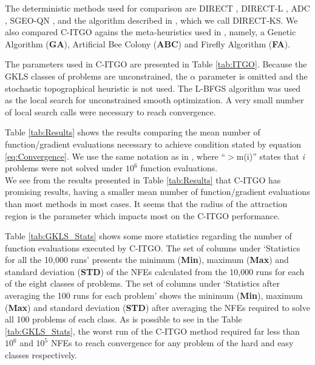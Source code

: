The deterministic methods used for comparison are DIRECT \citep{DIRECT}, DIRECT-L \citep{DIRECTL}, ADC \citep{ADC}, SGEO-QN \citep{SGEO}, and the algorithm described in \cite{ADC2}, which we call DIRECT-KS. We also compared C-ITGO agains the meta-heuristics used in \cite{NAT}, namely, a Genetic Algorithm (\textbf{GA}), Artificial Bee Colony (\textbf{ABC}) and Firefly Algorithm (\textbf{FA}).

The parameters used in C-ITGO are presented in Table \ref{tab:ITGO}. Because the GKLS classes of problems are unconstrained, the $\alpha$ parameter is omitted and the stochastic topographical heuristic is not used. The L-BFGS algorithm was used as the local search for unconstrained smooth optimization. A very small number of local search calls were necessary to reach convergence.



Table \ref{tab:Results} shows the results comparing the mean number of function/gradient evaluations necessary to achieve condition stated by equation \ref{eq:Convergence}. We use the same notation as in \cite{NAT}, where “$>$m(i)” states that \textit{i} problems were not solved under $10^6$ function evaluations.\\




We see from the results presented in Table \ref{tab:Results} that C-ITGO has promising results, having a smaller mean number of function/gradient evaluations than most methods in most cases. It seems that the radius of the attraction region is the parameter which impacts most on the C-ITGO performance. 

Table \ref{tab:GKLS_Stats} shows some more statistics regarding the number of function evaluations executed by C-ITGO. The set of columns under `Statistics for all the 10,000 runs' presents the minimum (\textbf{Min}), maximum (\textbf{Max}) and standard deviation (\textbf{STD}) of the NFEs calculated from the 10,000 runs for each of the eight classes of problems. The set of columns under `Statistics after averaging the 100 runs for each problem' shows the minimum (\textbf{Min}), maximum (\textbf{Max}) and standard deviation (\textbf{STD}) after averaging the NFEs required to solve all 100 problems of each class. As is possible to see in the Table \ref{tab:GKLS_Stats}, the worst run of the C-ITGO method required far less than $10^6$ and $10^5$ NFEs to reach convergence for any problem of the hard and easy classes respectively.

